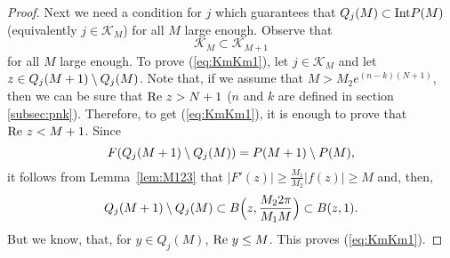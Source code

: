 \begin{proof}
  Next we need a condition for $j$ which guarantees that $Q_j(M)\subset\text{{\rm Int}}
  P(M)$ (equivalently $j\in \mathcal{K}_M$) for all $M$ large
  enough. Observe that
  \begin{equation} \label{eq:KmKm1}
  \mathcal{K}_{M}\subset\mathcal{K}_{M+1}
  \end{equation}
  for all $M$ large enough.  To prove (\ref{eq:KmKm1}), let $j\in
  \mathcal{K}_M$ and let $z\in Q_j(M+1)\setminus Q_j(M)$. Note that, if we assume
  that $M>M_2e^{(n-k)(N+1)}$, then we can be sure that $\textrm{Re } z > N+1$ ($n$
  and $k$ are defined in section \ref{subsec:pnk}).  Therefore, to get
  (\ref{eq:KmKm1}), it is enough to prove that $\textrm{Re } z < M+1$.  Since
  \[
  F(Q_j(M+1)\setminus Q_j(M))=P(M+1)\setminus P(M),
  \]
  it follows from Lemma~\ref{lem:M123} that
  $|F'(z)|\geq\frac{M_1}{M_2}|f(z)|\geq M$ and, then,
  \[
  Q_j(M+1)\setminus Q_j(M)\subset B\Big(z,\frac{M_2 2\pi}{M_1 M}\Big)\subset
  B(z,1).
  \]
  But we know, that, for $y\in Q_j(M)$, $\textrm{Re } y \leq M$. This proves
  (\ref{eq:KmKm1}).
\end{proof}

